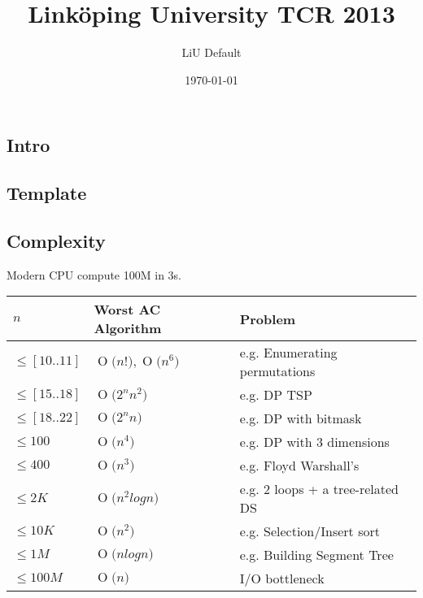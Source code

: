 \documentclass[a4paper,landscape,8pt]{article}
\newcommand{\BigO}[1]{\ensuremath{\operatorname{O}\bigl(#1\bigr)}}
\begin{document}
\title{Linköping University TCR 2013}
\author{LiU Default}
\date{\today}
\maketitle
\pagebreak

\thispagestyle{tcr}
\pagestyle{tcr}

\begin{multicols}{2}
\makeatletter
{}
\makeatother

\section{Intro}

\subsection{Template}



\subsection{Complexity}

Modern CPU compute 100M in 3s.

\begin{center}
    \begin{tabular}{ l l p{5cm}}
    \hline
    $n$             &   Worst AC Algorithm              & Problem \\ \hline
    $\leq [10..11]$ &   $\BigO{n!}, \BigO{n^6}$        & e.g. Enumerating permutations \\
    $\leq [15..18]$ &   $\BigO{2^n n^2} $              & e.g. DP TSP\\
    $\leq [18..22]$ &   $\BigO{2^n n} $                & e.g. DP with bitmask \\
    $\leq 100$      &   $\BigO{n^4} $                  & e.g. DP with 3 dimensions \\
    $\leq 400$      &   $\BigO{n^3} $                  & e.g. Floyd Warshall's \\
    $\leq 2K$       &   $\BigO{n^2 log n} $            & e.g. 2 loops + a tree-related DS \\
    $\leq 10K$      &   $\BigO{n^2} $                  & e.g. Selection/Insert sort \\
    $\leq 1M$       &   $\BigO{n log n} $              & e.g. Building Segment Tree  \\
    $\leq 100M$     &   $\BigO{n} $                    & I/O bottleneck \\
    \end{tabular}
\end{center}


\end{multicols}
\end{document}
